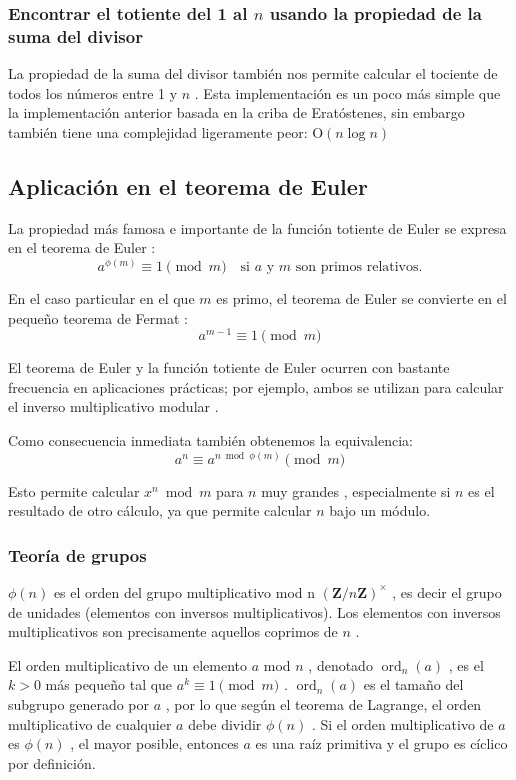 \subsubsection{Encontrar el totiente del 1 al $n$ usando la propiedad de la suma del divisor}

La propiedad de la suma del divisor también nos permite calcular el tociente de todos los números entre 1 y $n$ . Esta implementación es un poco más simple que la implementación anterior basada en la criba de Eratóstenes, sin embargo también tiene una complejidad ligeramente peor: O$(n \log n)$



\subsection{Aplicación en el teorema de Euler}

La propiedad más famosa e importante de la función totiente de Euler se expresa en el teorema de Euler :
$$a^{\phi(m)} \equiv 1 \pmod m \quad \text{si } a \text{ y } m \text{ son primos relativos.}$$

En el caso particular en el que $m$ es primo, el teorema de Euler se convierte en el pequeño teorema de Fermat :
$$a^{m - 1} \equiv 1 \pmod m$$

El teorema de Euler y la función totiente de Euler ocurren con bastante frecuencia en aplicaciones prácticas; por ejemplo, ambos se utilizan para calcular el inverso multiplicativo modular .

Como consecuencia inmediata también obtenemos la equivalencia:
$$a^n \equiv a^{n \bmod \phi(m)} \pmod m$$

Esto permite calcular $x^n \bmod m$ para $n$ muy grandes , especialmente si $n$ es el resultado de otro cálculo, ya que permite calcular $n$ bajo un módulo.

\subsubsection{Teoría de grupos}

$\phi(n)$ es el orden del grupo multiplicativo mod n $(\mathbf{Z} /n\mathbf{Z} )^\times$ , es decir el grupo de unidades (elementos con inversos multiplicativos). Los elementos con inversos multiplicativos son precisamente aquellos coprimos de $n$ .

El orden multiplicativo de un elemento $a$ mod $n$ , denotado $\operatorname{ord}_n(a)$ , es el $k>0$ más pequeño tal que $a^k \equiv 1 \pmod m$ . $\operatorname{ord}_n(a)$ es el tamaño del subgrupo generado por $a$ , por lo que según el teorema de Lagrange, el orden multiplicativo de cualquier $a$ debe dividir $\phi(n)$ . Si el orden multiplicativo de $a$ es $\phi(n)$ , el mayor posible, entonces $a$ es una raíz primitiva y el grupo es cíclico por definición.

